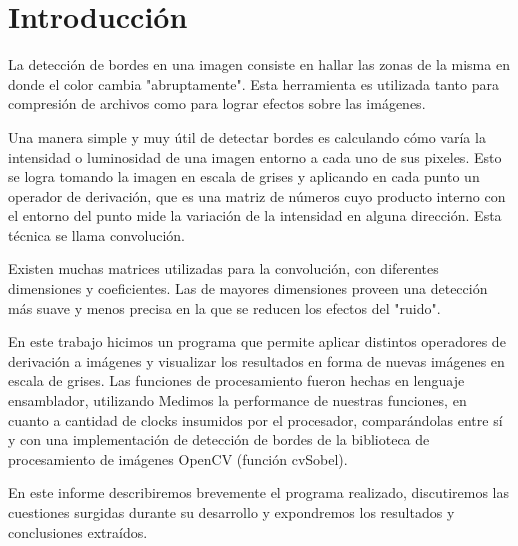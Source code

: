 \section{Introducción}

La detección de bordes en una imagen consiste en hallar las zonas de la misma en donde el color cambia "abruptamente". Esta herramienta es utilizada tanto para compresión de archivos como para lograr efectos sobre las imágenes.

Una manera simple y muy útil de detectar bordes es calculando cómo varía la intensidad o luminosidad de una imagen entorno a cada uno de sus pixeles. Esto se logra tomando la imagen en escala de grises y aplicando en cada punto un operador de derivación, que es una matriz de números cuyo producto interno con el entorno del punto mide la variación de la intensidad en alguna dirección. Esta técnica se llama convolución.

Existen muchas matrices utilizadas para la convolución, con diferentes dimensiones y coeficientes. Las de mayores dimensiones proveen una detección más suave y menos precisa en la que se reducen los efectos del "ruido".

En este trabajo hicimos un programa que permite aplicar distintos operadores de derivación a imágenes y visualizar los resultados en forma de nuevas imágenes en escala de grises. Las funciones de procesamiento fueron hechas en lenguaje ensamblador, utilizando %
Medimos la performance de nuestras funciones, en cuanto a cantidad de clocks insumidos por el procesador, comparándolas entre sí y con una implementación de detección de bordes de la biblioteca de procesamiento de imágenes OpenCV (función cvSobel).

En este informe describiremos brevemente el programa realizado, discutiremos las cuestiones surgidas durante su desarrollo y expondremos los resultados y conclusiones extraídos.
